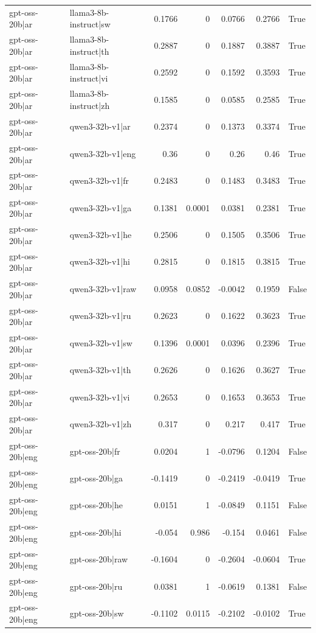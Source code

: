 \begin{table}
\begin{tabular}{l l r r r r l}
gpt-oss-20b|ar & llama3-8b-instruct|sw & 0.1766 & 0 & 0.0766 & 0.2766 & True \\
gpt-oss-20b|ar & llama3-8b-instruct|th & 0.2887 & 0 & 0.1887 & 0.3887 & True \\
gpt-oss-20b|ar & llama3-8b-instruct|vi & 0.2592 & 0 & 0.1592 & 0.3593 & True \\
gpt-oss-20b|ar & llama3-8b-instruct|zh & 0.1585 & 0 & 0.0585 & 0.2585 & True \\
gpt-oss-20b|ar & qwen3-32b-v1|ar & 0.2374 & 0 & 0.1373 & 0.3374 & True \\
gpt-oss-20b|ar & qwen3-32b-v1|eng & 0.36 & 0 & 0.26 & 0.46 & True \\
gpt-oss-20b|ar & qwen3-32b-v1|fr & 0.2483 & 0 & 0.1483 & 0.3483 & True \\
gpt-oss-20b|ar & qwen3-32b-v1|ga & 0.1381 & 0.0001 & 0.0381 & 0.2381 & True \\
gpt-oss-20b|ar & qwen3-32b-v1|he & 0.2506 & 0 & 0.1505 & 0.3506 & True \\
gpt-oss-20b|ar & qwen3-32b-v1|hi & 0.2815 & 0 & 0.1815 & 0.3815 & True \\
gpt-oss-20b|ar & qwen3-32b-v1|raw & 0.0958 & 0.0852 & -0.0042 & 0.1959 & False \\
gpt-oss-20b|ar & qwen3-32b-v1|ru & 0.2623 & 0 & 0.1622 & 0.3623 & True \\
gpt-oss-20b|ar & qwen3-32b-v1|sw & 0.1396 & 0.0001 & 0.0396 & 0.2396 & True \\
gpt-oss-20b|ar & qwen3-32b-v1|th & 0.2626 & 0 & 0.1626 & 0.3627 & True \\
gpt-oss-20b|ar & qwen3-32b-v1|vi & 0.2653 & 0 & 0.1653 & 0.3653 & True \\
gpt-oss-20b|ar & qwen3-32b-v1|zh & 0.317 & 0 & 0.217 & 0.417 & True \\
gpt-oss-20b|eng & gpt-oss-20b|fr & 0.0204 & 1 & -0.0796 & 0.1204 & False \\
gpt-oss-20b|eng & gpt-oss-20b|ga & -0.1419 & 0 & -0.2419 & -0.0419 & True \\
gpt-oss-20b|eng & gpt-oss-20b|he & 0.0151 & 1 & -0.0849 & 0.1151 & False \\
gpt-oss-20b|eng & gpt-oss-20b|hi & -0.054 & 0.986 & -0.154 & 0.0461 & False \\
gpt-oss-20b|eng & gpt-oss-20b|raw & -0.1604 & 0 & -0.2604 & -0.0604 & True \\
gpt-oss-20b|eng & gpt-oss-20b|ru & 0.0381 & 1 & -0.0619 & 0.1381 & False \\
gpt-oss-20b|eng & gpt-oss-20b|sw & -0.1102 & 0.0115 & -0.2102 & -0.0102 & True \\

\end{tabular}
\end{table}
